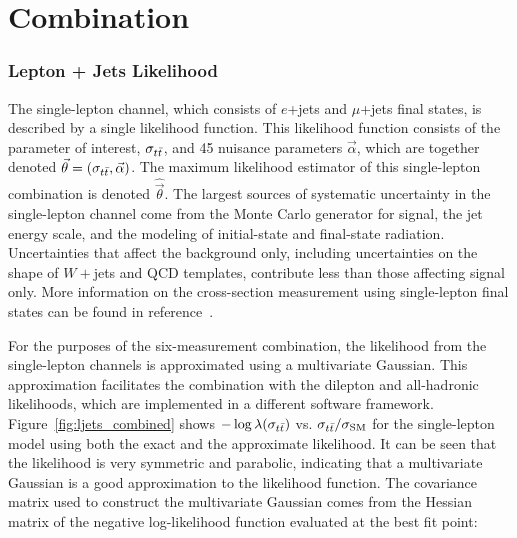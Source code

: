 
\section{Combination}

\subsubsection{Lepton + Jets Likelihood}

\label{sec:lepjets}

The single-lepton channel, which consists of $e$+jets and $\mu$+jets final states, is described by a single likelihood function.
This likelihood function consists of the parameter of interest, $\sigma_{t\bar{t}}$, and 45 nuisance parameters $\vec{\alpha}$, 
which are together denoted $\vec{\theta} = (\sigma_{t\bar{t}}, \vec{\alpha})$.
The maximum likelihood estimator of this single-lepton combination is denoted $\hat{\vec{\theta}}$.
The largest sources of systematic uncertainty in the single-lepton channel come from the Monte Carlo generator for signal, the jet energy scale, and the modeling of initial-state and final-state radiation.
Uncertainties that affect the background only, including uncertainties on the shape of $W+$jets and QCD templates, contribute less than those affecting signal only.
More information on the cross-section measurement using single-lepton final states can be found in reference~\cite{LEPTON_JETS_NOTE_2011}.

For the purposes of the six-measurement combination, the likelihood from the single-lepton channels is approximated using a multivariate Gaussian.
This approximation facilitates the combination with the dilepton and all-hadronic likelihoods, which are implemented in a different software framework.  
Figure~\ref{fig:ljets_combined} shows $-\log\lambda(\sigma_{t\bar{t}})$ vs. $\sigma_{t\bar{t}}/\sigma_{\rm SM}$ for the single-lepton model using both the exact and the approximate likelihood.
It can be seen that the likelihood is very symmetric and parabolic, indicating that a multivariate Gaussian is a good approximation to the likelihood function. 
The covariance matrix used to construct the multivariate Gaussian comes from the Hessian matrix of the negative log-likelihood function evaluated at the best fit point:


